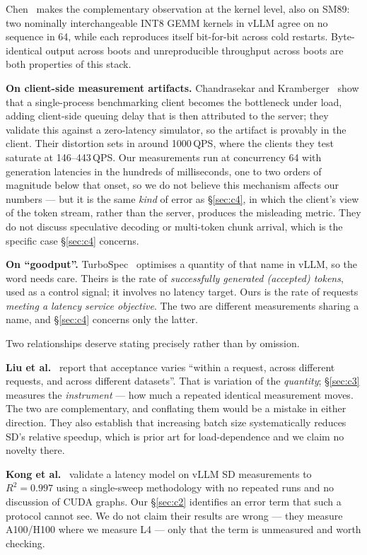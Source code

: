 \documentclass[11pt]{article}
\begin{document}
Chen~\cite{chen2026integer} makes the complementary observation at the
kernel level, also on SM89: two nominally interchangeable INT8 GEMM kernels
in vLLM agree on no sequence in 64, while each reproduces itself
bit-for-bit across cold restarts. Byte-identical output across boots and
unreproducible throughput across boots are both properties of this stack.

\textbf{On client-side measurement artifacts.}
Chandrasekar and Kramberger~\cite{chandrasekar2026bias} show that a
single-process benchmarking client becomes the bottleneck under load, adding
client-side queuing delay that is then attributed to the server; they
validate this against a zero-latency simulator, so the artifact is provably
in the client. Their distortion sets in around 1000\,QPS, where the clients
they test saturate at 146--443\,QPS. Our measurements run at concurrency 64
with generation latencies in the hundreds of milliseconds, one to two orders
of magnitude below that onset, so we do not believe this mechanism affects
our numbers --- but it is the same \emph{kind} of error as \S\ref{sec:c4}, in
which the client's view of the token stream, rather than the server, produces
the misleading metric. They do not discuss speculative decoding or
multi-token chunk arrival, which is the specific case \S\ref{sec:c4} concerns.

\textbf{On ``goodput''.} TurboSpec~\cite{liu2024turbospec} optimises a
quantity of that name in vLLM, so the word needs care. Theirs is the rate of
\emph{successfully generated (accepted) tokens}, used as a control signal;
it involves no latency target. Ours is the rate of requests \emph{meeting a
latency service objective}. The two are different measurements sharing a
name, and \S\ref{sec:c4} concerns only the latter.

Two relationships deserve stating precisely rather than by omission.

\textbf{Liu et al.}~\cite{liu2026illusion} report that acceptance varies
``within a request, across different requests, and across different
datasets''. That is variation of the \emph{quantity}; \S\ref{sec:c3} measures
the \emph{instrument} --- how much a repeated identical measurement moves.
The two are complementary, and conflating them would be a mistake in either
direction. They also establish that increasing batch size systematically
reduces SD's relative speedup, which is prior art for load-dependence and we
claim no novelty there.

\textbf{Kong et al.}~\cite{kong2026latency} validate a latency model on vLLM
SD measurements to $R^2 = 0.997$ using a single-sweep methodology with no
repeated runs and no discussion of CUDA graphs. Our \S\ref{sec:c2} identifies
an error term that such a protocol cannot see. We do not claim their results
are wrong --- they measure A100/H100 where we measure L4 --- only that the
term is unmeasured and worth checking.
\end{document}
